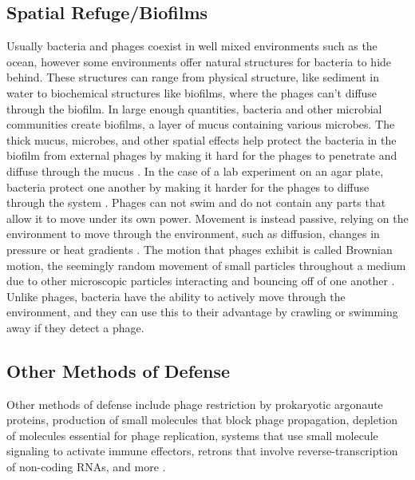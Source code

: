 \subsection{Spatial Refuge/Biofilms} 
Usually bacteria and phages coexist in well mixed environments such as the ocean, however some environments offer natural structures for bacteria to hide behind. 
These structures can range from physical structure, like sediment in water to biochemical structures like biofilms, where the phages can't diffuse through the biofilm. 
In large enough quantities, bacteria and other microbial communities create biofilms, a layer of mucus containing various microbes. 
The thick mucus, microbes, and other spatial effects help protect the bacteria in the biofilm from external phages by making it hard for the phages to penetrate and diffuse through the mucus \cite{abedonPhageDelayEnhancing2017}. 
In the case of a lab experiment on an agar plate, bacteria protect one another by making it harder for the phages to diffuse through the system \cite{eriksenGrowingMicrocolonyCan2018}. \newline
Phages can not swim and do not contain any parts that allow it to move under its own power. 
Movement is instead passive, relying on the environment to move through the environment, such as diffusion, changes in pressure or heat gradients \cite{lohrmannInfluenceBacterialSwimming2024}. 
The motion that phages exhibit is called Brownian motion, the seemingly random movement of small particles throughout a medium due to other microscopic particles interacting and bouncing off of one another \cite{moineauBacteriophage2013}. 
Unlike phages, bacteria have the ability to actively move through the environment, and they can use this to their advantage by crawling or swimming away if they detect a phage. 

\subsection{Other Methods of Defense}
Other methods of defense include phage restriction by prokaryotic argonaute proteins, production of small molecules that block phage propagation, depletion of molecules essential for phage replication, systems that use small molecule signaling to activate immune effectors, retrons that involve reverse-transcription of non-coding RNAs, and more \cite{stokar-avihailDiscoveryPhageDeterminants2023}.


